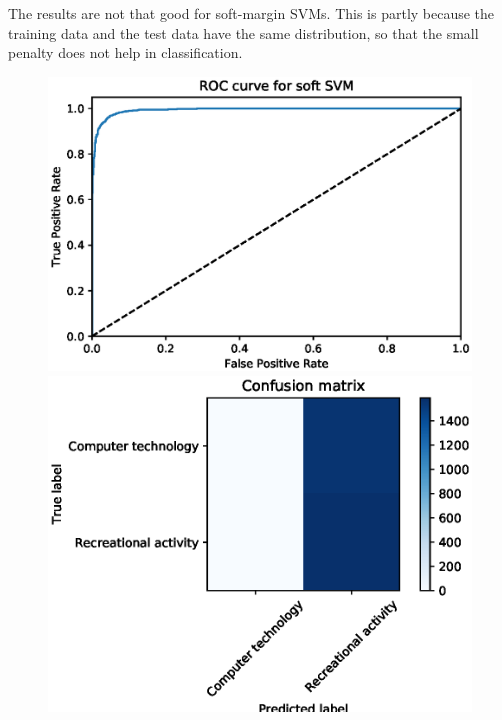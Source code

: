 \documentclass[letterpaper]{article}
\begin{document}
The results are not that good for soft-margin SVMs.
This is partly because the training data and the test data
have the same distribution,
so that the small penalty does not help in classification.
\begin{figure}[!htb]
\centering
\begin{minipage}{0.5\textwidth}
\includegraphics[width=1.0\textwidth]{roc-lsi-soft-svm}
\end{minipage}%
\begin{minipage}{0.5\textwidth}
\includegraphics[width=1.0\textwidth]{conf-mat-lsi-soft-svm}
\end{minipage}
\begin{minipage}{0.5\textwidth}

\end{minipage}
\end{figure}
\end{document}
